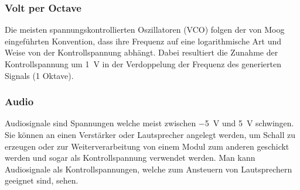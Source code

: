 \subsubsection{Volt per Octave}
\label{sec:orga5d4270}
Die meisten spannungskontrollierten Oszillatoren (VCO) folgen der von Moog eingeführten Konvention, dass ihre Frequenz auf eine logarithmische Art und Weise von der Kontrollspannung abhängt. Dabei resultiert die Zunahme der Kontrollspannung um \SI{1}{\volt} in der Verdoppelung der Frequenz des generierten Signals (1 Oktave).

\subsubsection{Audio}
\label{sec:orga990e1d}
Audiosignale sind Spannungen welche meist zwischen \SI{-5}{\volt} und \SI{5}{\volt} schwingen. Sie können an einen Verstärker oder Lautsprecher angelegt werden, um Schall zu erzeugen oder zur Weiterverarbeitung von einem Modul zum anderen geschickt werden und sogar als Kontrollspannung verwendet werden. Man kann Audiosignale als Kontrollspannungen, welche zum Ansteuern von Lautsprechern geeignet sind, sehen.
